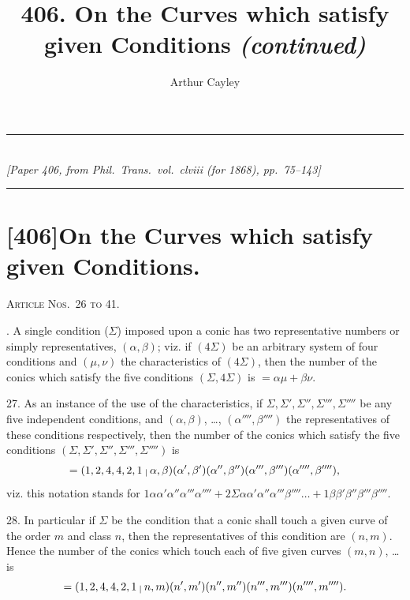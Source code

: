 \documentclass[12pt,a4paper]{article}
\title{\textbf{406.} On the Curves which satisfy given Conditions \textit{(continued)}}
\author{Arthur Cayley}
\date{}
\begin{document}
\maketitle
\thispagestyle{empty}

\begin{center}
\rule{0.5\textwidth}{0.4pt}\\[0.5em]
\textit{[Paper 406, from \textit{Phil.\ Trans.}\ vol.~clviii (for 1868), pp.~75--143]}\\[0.3em]
\rule{0.5\textwidth}{0.4pt}
\end{center}

\vspace{1em}

\section*{[406]\quad On the Curves which satisfy given Conditions.}

\medskip\noindent\textsc{Article Nos.~26 to 41.}

\smallskip

. A single condition ($\Sigma$) imposed upon a conic has two representative numbers or simply representatives, $(\alpha, \beta)$; viz. if $(4\Sigma)$ be an arbitrary system of four conditions and $(\mu, \nu)$ the characteristics of $(4\Sigma)$, then the number of the conics which satisfy the five conditions $(\Sigma, 4\Sigma)$ is $=\alpha\mu + \beta\nu$.

27. As an instance of the use of the characteristics, if $\Sigma, \Sigma', \Sigma'', \Sigma''', \Sigma''''$ be any five independent conditions, and $(\alpha, \beta)$, \dots, $(\alpha'''', \beta'''')$ the representatives of these conditions respectively, then the number of the conics which satisfy the five conditions $(\Sigma, \Sigma', \Sigma'', \Sigma''', \Sigma'''')$ is
\[
=(1, 2, 4, 4, 2, 1 \mathbin{\raisebox{-0.25ex}{$\scriptstyle\mid$}} \alpha, \beta)(\alpha', \beta')(\alpha'', \beta'')(\alpha''', \beta''')(\alpha'''', \beta''''),
\]
viz. this notation stands for $1\alpha\alpha'\alpha''\alpha'''\alpha'''' + 2\Sigma\alpha\alpha'\alpha''\alpha'''\beta'''' \ldots + 1\beta\beta'\beta''\beta'''\beta''''$.

28. In particular if $\Sigma$ be the condition that a conic shall touch a given curve of the order $m$ and class $n$, then the representatives of this condition are $(n, m)$. Hence the number of the conics which touch each of five given curves $(m, n)$, \dots{} is
\[
=(1, 2, 4, 4, 2, 1 \mathbin{\raisebox{-0.25ex}{$\scriptstyle\mid$}} n, m)(n', m')(n'', m'')(n''', m''')(n'''', m'''').
\]
\end{document}
